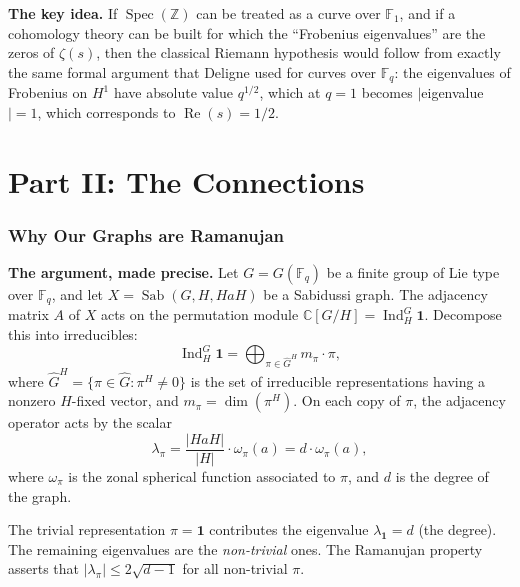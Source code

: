 \documentclass[11pt,a4paper]{article}
\theoremstyle{plain}
\theoremstyle{definition}
\newcommand{\Z}{\mathbb{Z}}
\newcommand{\C}{\mathbb{C}}
\newcommand{\F}{\mathbb{F}}
\newcommand{\Sab}{\operatorname{Sab}}
\newcommand{\Ind}{\operatorname{Ind}}
\newcommand{\Spec}{\operatorname{Spec}}
\begin{document}
\begin{tcolorbox}[colback=yellow!12, colframe=yellow!12,
  boxrule=0pt, sharp corners]
\textbf{The key idea.}
If $\Spec(\Z)$ can be treated as a curve over $\F_1$, and if a
cohomology theory can be built for which the ``Frobenius eigenvalues''
are the zeros of $\zeta(s)$, then the classical Riemann hypothesis
would follow from exactly the same formal argument that Deligne used
for curves over $\F_q$: the eigenvalues of Frobenius on $H^1$ have
absolute value $q^{1/2}$, which at $q = 1$ becomes
$|$eigenvalue$| = 1$, which corresponds to
$\operatorname{Re}(s) = 1/2$.
\end{tcolorbox}



\part*{Part II: The Connections}

\section{Why Our Graphs are Ramanujan}
\label{sec:why-ramanujan}

\begin{tcolorbox}[breakable, colback=black!5, colframe=black!5,
  boxrule=0pt, sharp corners]
\textbf{The argument, made precise.}
Let $G = G(\F_q)$ be a finite group of Lie type over $\F_q$, and let
$X = \Sab(G, H, HaH)$ be a Sabidussi graph. The adjacency matrix $A$
of $X$ acts on the permutation module $\C[G/H] = \Ind_H^G \mathbf{1}$.
Decompose this into irreducibles:
\[
  \Ind_H^G \mathbf{1} = \bigoplus_{\pi \in \widehat{G}^H}
  m_\pi \cdot \pi,
\]
where $\widehat{G}^H = \{\pi \in \widehat{G} : \pi^H \neq 0\}$ is
the set of irreducible representations having a nonzero $H$-fixed
vector, and $m_\pi = \dim(\pi^H)$. On each copy of $\pi$, the
adjacency operator acts by the scalar
\[
  \lambda_\pi = \frac{|HaH|}{|H|} \cdot \omega_\pi(a)
  = d \cdot \omega_\pi(a),
\]
where $\omega_\pi$ is the zonal spherical function associated to
$\pi$, and $d$ is the degree of the graph.

The trivial representation $\pi = \mathbf{1}$ contributes the
eigenvalue $\lambda_{\mathbf{1}} = d$ (the degree). The remaining
eigenvalues are the \emph{non-trivial} ones. The Ramanujan property
asserts that $|\lambda_\pi| \leq 2\sqrt{d-1}$ for all non-trivial
$\pi$.
\end{tcolorbox}
\end{document}
